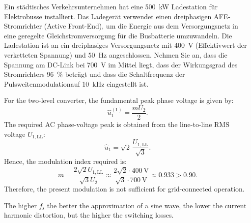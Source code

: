 \begin{germanblock}
	Ein städtisches Verkehrsunternehmen hat eine \SI{500}{\kilo\watt} Ladestation für Elektrobusse installiert.
	Das Ladegerät verwendet einen dreiphasigen AFE-Stromrichter (Active Front-End), um die Energie
	aus dem Versorgungsnetz in eine geregelte Gleichstromversorgung für die Busbatterie umzuwandeln. Die Ladestation ist an ein dreiphasiges Versorgungsnetz mit \SI{400}{\volt}
	(Effektivwert der verketteten Spannung) und \SI{50}{\hertz} angeschlossen. Nehmen Sie an, dass die Spannung am DC-Link bei \SI{700}{\volt} im Mittel liegt, dass der Wirkungsgrad des Stromrichters \SI{96}{\percent} beträgt und dass die Schaltfrequenz der Pulsweitenmodulationauf \SI{10}{\kilo\hertz} eingestellt ist.
\end{germanblock}

\begin{solutionblock}
	For the two-level converter, the fundamental peak phase voltage is given by:
	$$\hat{u}_1^{(1)} = \frac{mU_2}{2}.$$
	The required AC phase-voltage peak is obtained from the line-to-line RMS voltage $U_{1,\mathrm{LL}}$:
	$$\hat{u}_1 = \sqrt{2}\,\frac{U_{1,\mathrm{LL}}}{\sqrt{3}}.$$
	Hence, the modulation index required is:
	$$m = \frac{2\sqrt{2}U_{1,\mathrm{LL}}}{\sqrt{3}U_2}
		\approx \frac{2\sqrt{2}\cdot \SI{400}{\volt}}{\sqrt{3}\cdot \SI{700}{\volt}}
		\approx 0.933 > 0.90.$$
	Therefore, the present modulation is not sufficient for grid-connected operation.
\end{solutionblock}
\begin{solutionblock}
	The higher $f_\mathrm{s}$ the better the approximation of a sine wave, the lower the current harmonic distortion, but the higher the switching losses.

\end{solutionblock}
